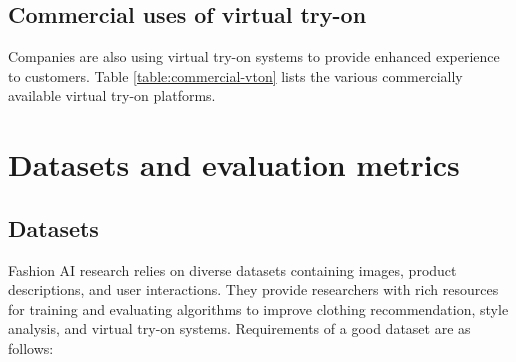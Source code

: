 	\subsection{Commercial uses of virtual try-on}
		Companies are also using virtual try-on systems to provide enhanced experience to customers. Table \ref{table:commercial-vton} lists the various commercially available virtual try-on platforms.

\section{Datasets and evaluation metrics}
	\subsection{Datasets}
		Fashion AI research relies on diverse datasets containing images, product descriptions, and user interactions. They provide researchers with rich resources for training and evaluating algorithms to improve clothing recommendation, style analysis, and virtual try-on systems. Requirements of a good dataset are as follows:

